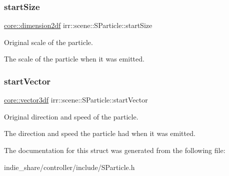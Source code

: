 \subsubsection{\texorpdfstring{start\+Size}{startSize}}
{\footnotesize\ttfamily \hyperlink{namespaceirr_1_1core_af6dc5c45ff13e7712758c827ff58676b}{core\+::dimension2df} irr\+::scene\+::\+S\+Particle\+::start\+Size}



Original scale of the particle. 

The scale of the particle when it was emitted. \mbox{\label{structirr_1_1scene_1_1SParticle_a5e8b1dcb8825e467b6ed2d4f48c321e2}} 
\subsubsection{\texorpdfstring{start\+Vector}{startVector}}
{\footnotesize\ttfamily \hyperlink{namespaceirr_1_1core_a06f169d08b5c429f5575acb7edbad811}{core\+::vector3df} irr\+::scene\+::\+S\+Particle\+::start\+Vector}



Original direction and speed of the particle. 

The direction and speed the particle had when it was emitted. 

The documentation for this struct was generated from the following file\+:\begin{DoxyCompactItemize}
\item 
indie\+\_\+share/controller/include/S\+Particle.\+h\end{DoxyCompactItemize}

